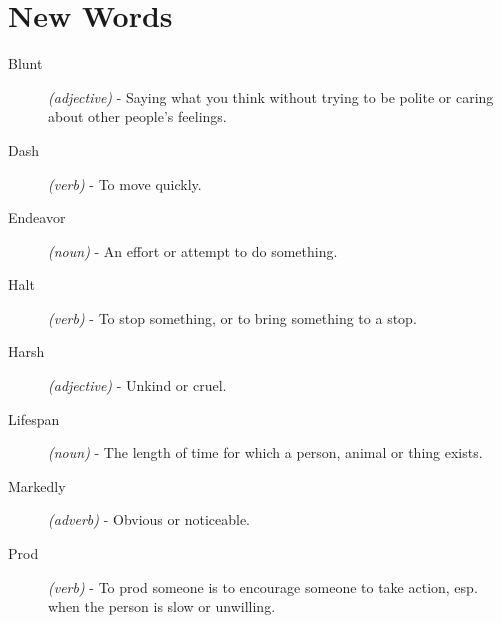 \documentclass[a4paper,12pt]{article}
\begin{document}
\titleTMB 
\newpage


\section{New Words}

\begin{description}



\item[Blunt]  {\it(adjective)} - Saying what you think without trying to be polite or caring about other people’s feelings.


\item[Dash] {\it(verb)} - To move quickly.


\item[Endeavor] {\it(noun)} - An effort or attempt to do something.

\item[Halt] {\it(verb)} - To stop something, or to bring something to a stop.

\item[Harsh] {\it(adjective)} - Unkind or cruel.

\item[Lifespan] {\it(noun)} - The length of time for which a person, animal or thing exists.

\item[Markedly] {\it(adverb)} - Obvious or noticeable.


\item[Prod] {\it(verb)} - To prod someone is to encourage someone to take action, esp. when
  the person is slow or unwilling.



\end{description}
\end{document}
